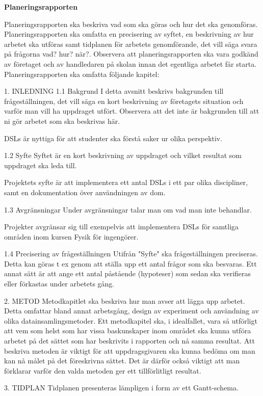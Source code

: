 \documentclass[12pt,a4paper,twoside,openright]{report}
\begin{document}
 
\textbf{Planeringsrapporten}

Planeringsrapporten ska beskriva vad som ska göras och hur det ska genomföras. Planeringsrapporten ska omfatta en precisering av syftet, en beskrivning av hur arbetet ska utföras samt tidplanen för arbetets genomförande, det vill säga svara på frågorna vad? hur? när?.
Observera att planeringsrapporten ska vara godkänd av företaget och av handledaren på skolan innan det egentliga arbetet får starta. Planeringsrapporten ska omfatta följande kapitel:

1. INLEDNING
1.1 Bakgrund
I detta avsnitt beskrivs bakgrunden till frågeställningen, det vill säga en kort beskrivning av företagets situation och varför man vill ha uppdraget utfört. Observera att det inte är bakgrunden till att ni gör arbetet som ska beskrivas här.

DSLs är nyttiga för att studenter ska förstå saker ur olika perspektiv.

1.2 Syfte
Syftet är en kort beskrivning av uppdraget och vilket resultat som uppdraget ska leda till.

Projektets syfte är att implementera ett antal DSLs i ett par olika discipliner, samt en dokumentation över användningen av dom.

1.3 Avgränsningar
Under avgränsningar talar man om vad man inte behandlar.

Projekter avgränsar sig till exempelvis att implementera DSLs för samtliga områden inom kursen Fysik för ingengörer.

1.4 Precisering av frågeställningen
Utifrån "Syfte" ska frågeställningen preciseras. Detta kan göras t ex genom att ställa upp ett antal frågor som ska besvaras. Ett annat sätt är att ange ett antal påstående (hypoteser) som sedan ska verifieras eller förkastas under arbetets gång.

2. METOD
Metodkapitlet ska beskriva hur man avser att lägga upp arbetet. Detta omfattar bland annat arbetsgång, design av experiment och användning av olika datainsamlingsmetoder. Ett metodkapitel ska, i idealfallet, vara så utförligt att vem som helst som har vissa baskunskaper inom området ska kunna utföra arbetet på det sättet som har beskrivits i rapporten och nå samma resultat. Att beskriva metoden är viktigt för att uppdragsgivaren ska kunna bedöma om man kan nå målet på det föreskrivna sättet. Det är därför också viktigt att man förklarar varför den valda metoden ger ett tillförlitligt resultat.

3. TIDPLAN
Tidplanen presenteras lämpligen i form av ett Gantt-schema.
\end{document}
